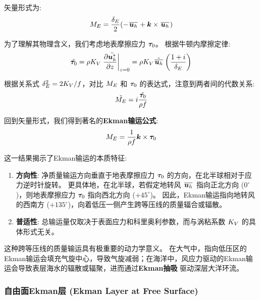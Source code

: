 矢量形式为:
\begin{equation}
    M_E = \frac{\delta_E}{2} (-\mkern2mu \overline{\bm{u}_h} \mkern2mu + \bm{k} \times \mkern2mu \overline{\bm{u}_h} \mkern2mu)
    \label{eq:ekman_transport_vector}
\end{equation}

为了理解其物理含义，我们考虑地表摩擦应力 ${\bm{\tau}}_0$。
根据牛顿内摩擦定律:
\begin{equation*}
    \complex{\wind_0} = \density \eddyviscv \left.\pde{\complex{\flayer{\vel_h}}}{z}\right|_{z=0} = \density \eddyviscv \complex{\mean{\vel_h}} \left(\frac{1+i}{\ekmandepth}\right)
\end{equation*}

根据关系式 $\delta_E^2 = 2K_V/f$，对比 $M_E$ 和 ${\bm{\tau}}_0$ 的表达式，注意到两者间的代数关系:
\begin{equation*}
    \tilde{M_E} = i \frac{\tilde{{\bm{\tau}}_0}}{\rho f}
\end{equation*}

回到矢量形式，我们得到著名的\textbf{Ekman输运公式}:
\begin{equation}
    M_E = \frac{1}{\rho f} \bm{k} \times {\bm{\tau}}_0
    \label{eq:ekman_transport}
\end{equation}

这一结果揭示了Ekman输运的本质特征:
\begin{enumerate}
    \item \textbf{方向性}: 净质量输运方向垂直于地表摩擦应力 ${\bm{\tau}}_0$ 的方向，在北半球相对于应力逆时针旋转。
    更具体地，在北半球，若假定地转风 $\mkern2mu \overline{\bm{u}_h} \mkern2mu$ 指向正北方向 ($0^\circ$)，则地表摩擦应力 ${\bm{\tau}}_0$ 指向西北方向 ($+45^\circ$)。
    因此，Ekman输运指向地转风的西南方 ($+135^\circ$)，向着低压一侧产生跨等压线的质量辐合或辐散。
    \item \textbf{普适性}: 总输运量仅取决于表面应力和科里奥利参数，而与涡粘系数 $K_V$ 的具体形式无关。
\end{enumerate}

这种跨等压线的质量输运具有极重要的动力学意义。
在大气中，指向低压区的Ekman输运会填充气旋中心，导致气旋减弱；在海洋中，风应力驱动的Ekman输运会导致表层海水的辐散或辐聚，进而通过\textbf{Ekman抽吸} 驱动深层大洋环流。

\subsubsection{自由面Ekman层 (Ekman Layer at Free Surface)}

